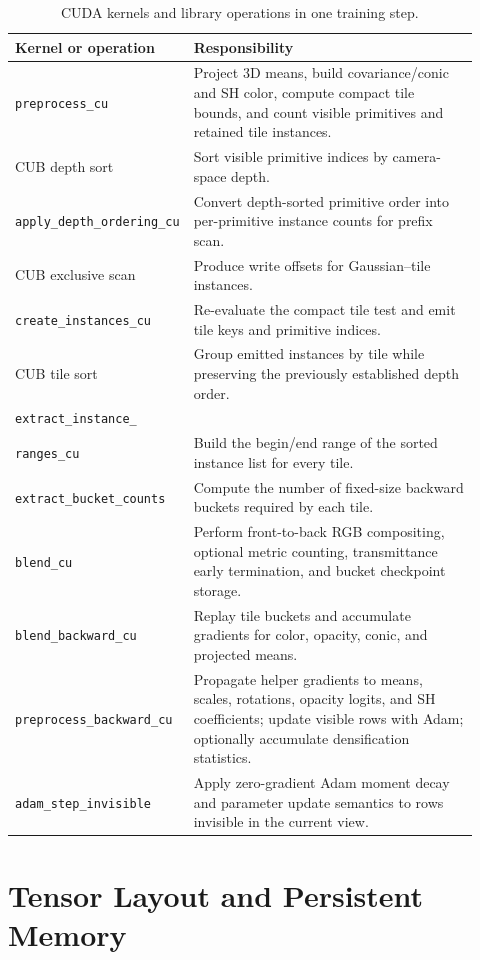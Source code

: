 \begin{table}[H]
\centering
\caption{CUDA kernels and library operations in one training step.}
\label{tab:kernel-inventory}
\scriptsize
\begin{tabular}{p{0.28\linewidth}p{0.64\linewidth}}
\toprule
Kernel or operation & Responsibility \\
\midrule
\texttt{preprocess\_cu} & Project 3D means, build covariance/conic and SH color, compute compact tile bounds, and count visible primitives and retained tile instances. \\
CUB depth sort & Sort visible primitive indices by camera-space depth. \\
\texttt{apply\_depth\_ordering\_cu} & Convert depth-sorted primitive order into per-primitive instance counts for prefix scan. \\
CUB exclusive scan & Produce write offsets for Gaussian--tile instances. \\
\texttt{create\_instances\_cu} & Re-evaluate the compact tile test and emit tile keys and primitive indices. \\
CUB tile sort & Group emitted instances by tile while preserving the previously established depth order. \\
\texttt{extract\_instance\_}\\\texttt{ranges\_cu} & Build the begin/end range of the sorted instance list for every tile. \\
\texttt{extract\_bucket\_counts} & Compute the number of fixed-size backward buckets required by each tile. \\
\texttt{blend\_cu} & Perform front-to-back RGB compositing, optional metric counting, transmittance early termination, and bucket checkpoint storage. \\
\texttt{blend\_backward\_cu} & Replay tile buckets and accumulate gradients for color, opacity, conic, and projected means. \\
\texttt{preprocess\_backward\_cu} & Propagate helper gradients to means, scales, rotations, opacity logits, and SH coefficients; update visible rows with Adam; optionally accumulate densification statistics. \\
\texttt{adam\_step\_invisible} & Apply zero-gradient Adam moment decay and parameter update semantics to rows invisible in the current view. \\
\bottomrule
\end{tabular}
\end{table}

\section{Tensor Layout and Persistent Memory}

